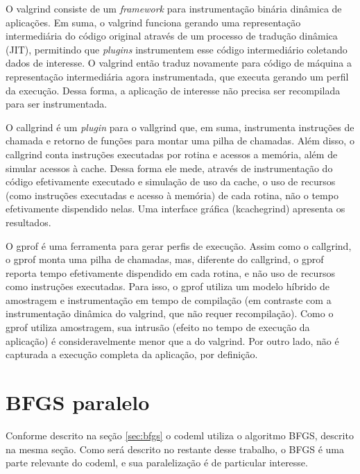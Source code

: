 \documentclass[cic,tc]{iiufrgs}
\begin{document}
O valgrind \cite{nethercote2007valgrind} consiste de um \textit{framework} para
instrumentação binária dinâmica de aplicações. Em suma, o valgrind funciona
gerando uma representação intermediária do código original através de um
processo de tradução dinâmica (JIT), permitindo que \textit{plugins} 
instrumentem esse código intermediário coletando dados de interesse. O valgrind
então traduz novamente para código de máquina a representação intermediária
agora instrumentada, que executa gerando um perfil da execução. Dessa forma, a
aplicação de interesse não precisa ser recompilada para ser instrumentada.

O callgrind \cite{weidendorfer2008sequential} é um \textit{plugin} para o
vallgrind que, em suma, instrumenta instruções de chamada e retorno de funções
para montar uma pilha de chamadas. Além disso, o callgrind conta instruções
executadas por rotina e acessos a memória, além de simular acessos à cache.
Dessa forma ele mede, através de instrumentação do código efetivamente
executado e simulação de uso da cache, o uso de recursos (como instruções
executadas e acesso à memória) de cada rotina, não o tempo efetivamente
dispendido nelas. Uma interface gráfica (kcachegrind) apresenta os resultados.

O gprof \cite{graham1982gprof} é uma ferramenta para gerar perfis de execução.
Assim como o callgrind, o gprof monta uma pilha de chamadas, mas, diferente do
callgrind, o gprof reporta tempo efetivamente dispendido em cada rotina, e não
uso de recursos como instruções executadas. Para isso, o gprof utiliza um
modelo híbrido de amostragem e instrumentação em tempo de compilação (em
contraste com a instrumentação dinâmica do valgrind, que não requer
recompilação). Como o gprof utiliza amostragem, sua intrusão (efeito no tempo
de execução da aplicação) é consideravelmente menor que a do valgrind. Por
outro lado, não é capturada a execução completa da aplicação, por definição.

\section{BFGS paralelo}
\label{sec:parbfgs}

Conforme descrito na seção \ref{sec:bfgs} o codeml utiliza o algoritmo BFGS,
descrito na mesma seção. Como será descrito no restante desse trabalho, o BFGS
é uma parte relevante do codeml, e sua paralelização é de particular interesse.
\end{document}
